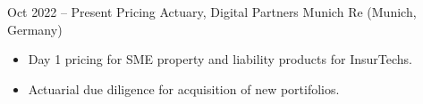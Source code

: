 \documentclass[a4paper,]{fortysecondscv}
\begin{document}
\begin{cvtable}%

    \vspace{\topsep}
    \cvitem
    {Oct 2022 -- Present}
    {Pricing Actuary, Digital Partners}
    {Munich Re (Munich, Germany)}
    {
        \vspace{-\topsep}
        \begin{itemize}[nosep, leftmargin=0pt] %
            \item Day 1 pricing for SME property and liability products for InsurTechs.
            \item Actuarial due diligence for acquisition of new portifolios.
        \end{itemize}
    }


\end{cvtable}
\end{document}
